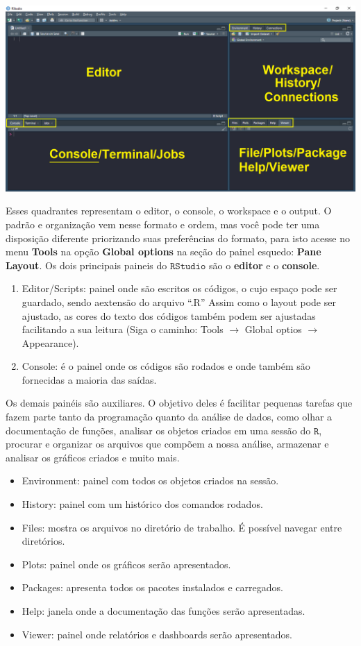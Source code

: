 \documentclass[
]{book}
\providecommand{\tightlist}{%
  \setlength{\itemsep}{0pt}\setlength{\parskip}{0pt}}
\begin{document}
\begin{center}\includegraphics{RStudio} \end{center}

Esses quadrantes representam o editor, o console, o workspace e o output. O padrão e organização vem nesse formato e ordem, mas você pode ter uma disposição diferente priorizando suas preferências do formato, para isto acesse no menu \textbf{Tools} na opção \textbf{Global options} na seção do painel esquedo: \textbf{Pane Layout}. Os dois principais paineis do \(\texttt{RStudio}\) são o \textbf{editor} e o \textbf{console}.

\begin{enumerate}
\def\labelenumi{\arabic{enumi}.}
\item
  Editor/Scripts: painel onde são escritos os códigos, o cujo espaço pode ser guardado, sendo aextensão do arquivo ``.R'' Assim como o layout pode ser ajustado, as cores do texto dos códigos também podem ser ajustadas facilitando a sua leitura (Siga o caminho: Tools \(\rightarrow\) Global optios \(\rightarrow\) Appearance).
\item
  Console: é o painel onde os códigos são rodados e onde também são fornecidas a maioria das saídas.
\end{enumerate}

Os demais painéis são auxiliares. O objetivo deles é facilitar pequenas tarefas que fazem parte tanto da programação quanto da análise de dados, como olhar a documentação de funções, analisar os objetos criados em uma sessão do \(\texttt{R}\), procurar e organizar os arquivos que compõem a nossa análise, armazenar e analisar os gráficos criados e muito mais.

\begin{itemize}
\tightlist
\item
  Environment: painel com todos os objetos criados na sessão.
\item
  History: painel com um histórico dos comandos rodados.
\item
  Files: mostra os arquivos no diretório de trabalho. É possível navegar entre diretórios.
\item
  Plots: painel onde os gráficos serão apresentados.
\item
  Packages: apresenta todos os pacotes instalados e carregados.
\item
  Help: janela onde a documentação das funções serão apresentadas.
\item
  Viewer: painel onde relatórios e dashboards serão apresentados.
\end{itemize}
\end{document}
